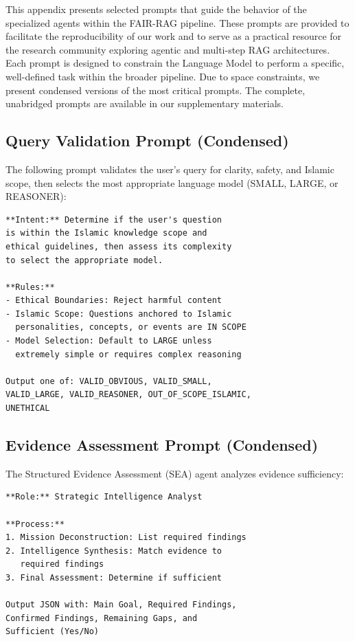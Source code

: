 \documentclass[11pt]{article}
\begin{document}
This appendix presents selected prompts that guide the behavior of the specialized agents within the FAIR-RAG pipeline. These prompts are provided to facilitate the reproducibility of our work and to serve as a practical resource for the research community exploring agentic and multi-step RAG architectures. Each prompt is designed to constrain the Language Model to perform a specific, well-defined task within the broader pipeline. Due to space constraints, we present condensed versions of the most critical prompts. The complete, unabridged prompts are available in our supplementary materials.

\subsection{Query Validation Prompt (Condensed)}

The following prompt validates the user's query for clarity, safety, and Islamic scope, then selects the most appropriate language model (SMALL, LARGE, or REASONER):

\begin{small}
\begin{verbatim}
**Intent:** Determine if the user's question 
is within the Islamic knowledge scope and 
ethical guidelines, then assess its complexity 
to select the appropriate model.

**Rules:**
- Ethical Boundaries: Reject harmful content
- Islamic Scope: Questions anchored to Islamic 
  personalities, concepts, or events are IN SCOPE
- Model Selection: Default to LARGE unless 
  extremely simple or requires complex reasoning

Output one of: VALID_OBVIOUS, VALID_SMALL, 
VALID_LARGE, VALID_REASONER, OUT_OF_SCOPE_ISLAMIC, 
UNETHICAL
\end{verbatim}
\end{small}

\subsection{Evidence Assessment Prompt (Condensed)}

The Structured Evidence Assessment (SEA) agent analyzes evidence sufficiency:

\begin{small}
\begin{verbatim}
**Role:** Strategic Intelligence Analyst

**Process:**
1. Mission Deconstruction: List required findings
2. Intelligence Synthesis: Match evidence to 
   required findings
3. Final Assessment: Determine if sufficient

Output JSON with: Main Goal, Required Findings, 
Confirmed Findings, Remaining Gaps, and 
Sufficient (Yes/No)
\end{verbatim}
\end{small}
\end{document}
